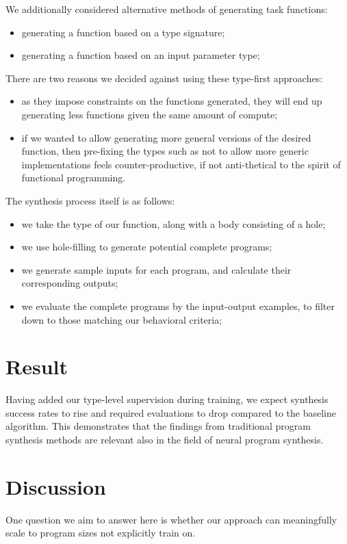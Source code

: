 \documentclass{article}
\begin{document}
We additionally considered alternative methods of generating task functions:
\begin{itemize}
    \item generating a function based on a type signature;
    \item generating a function based on an input parameter type; %
\end{itemize}
There are two reasons we decided against using these type-first approaches:
\begin{itemize}
    \item as they impose constraints on the functions generated, they will end up generating less functions given the same amount of compute;
    \item if we wanted to allow generating more general versions of the desired function, then pre-fixing the types such as not to allow more generic implementations feels counter-productive, if not anti-thetical to the spirit of functional programming.
\end{itemize}

The synthesis process itself is as follows:
\begin{itemize}
    \item we take the type of our function, along with a body consisting of a hole;
    \item we use hole-filling to generate potential complete programs;
    \item we generate sample inputs for each program, and calculate their corresponding outputs;
    \item we evaluate the complete programs by the input-output examples, to filter down to those matching our behavioral criteria;
\end{itemize}


\section{Result} %

Having added our type-level supervision during training, we expect synthesis success rates to rise and required evaluations to drop compared to the baseline algorithm.
This demonstrates that the findings from traditional program synthesis methods are relevant also in the field of neural program synthesis.


\section{Discussion} %

One question we aim to answer here is whether our approach can meaningfully scale to program sizes not explicitly train on.

\nocite{*}


\end{document}

